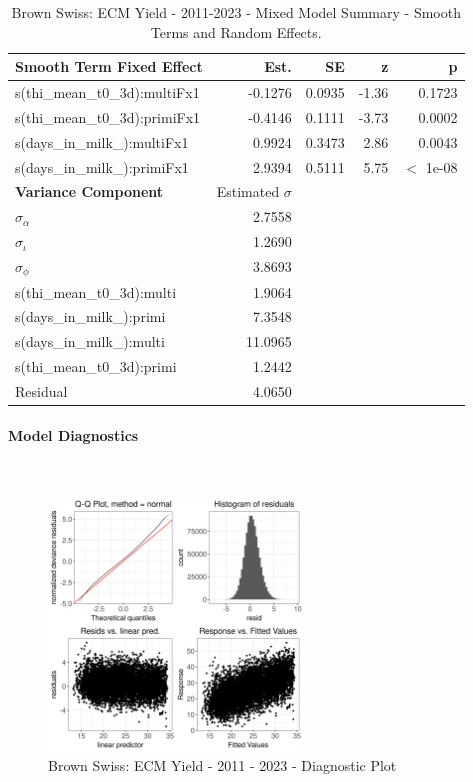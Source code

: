 \newpage
\begin{table}[H]
\centering
\begin{tabular}
{l | r | r | r | r}
\textbf{Smooth Term Fixed Effect} & Est. & SE & z & p\\
\hline
\hline
s(thi\_mean\_t0\_3d):multiFx1&  -0.1276 & 0.0935 & -1.36 & 0.1723 \\
s(thi\_mean\_t0\_3d):primiFx1 &  -0.4146 & 0.1111 & -3.73 & 0.0002 \\
s(days\_in\_milk\_):multiFx1 & 0.9924 & 0.3473 & 2.86 & 0.0043\\
s(days\_in\_milk\_):primiFx1 &  2.9394 & 0.5111 & 5.75 & $<$ 1e-08\\
\hline
\textbf{Variance Component} & Estimated $\sigma$ & & & \\
\hline
\hline
$\sigma_\alpha$ &  2.7558 &   & & \\
$\sigma_\iota$ & 1.2690 & & & \\
$\sigma_\phi$ & 3.8693 & & & \\
s(thi\_mean\_t0\_3d):multi &  1.9064& & & \\
s(days\_in\_milk\_):primi & 7.3548 & & & \\
s(days\_in\_milk\_):multi & 11.0965  & & & \\
s(thi\_mean\_t0\_3d):primi & 1.2442 & & & \\
Residual & 4.0650 & & & \\
\end{tabular}
\caption[]{Brown Swiss: ECM Yield - 2011-2023 - Mixed Model Summary - Smooth Terms and Random Effects.}
\end{table}


\paragraph{Model Diagnostics} \quad \\
\begin{figure}[H]
    \centering
    \includegraphics[width=0.6\textwidth]{thesis/figures/models/ecm/after2010/bs_ecm_after2010/bs_ecm_after2010_diagnostics.png}
    \caption[]{Brown Swiss: ECM Yield - 2011 - 2023 - Diagnostic Plot}
\end{figure}

